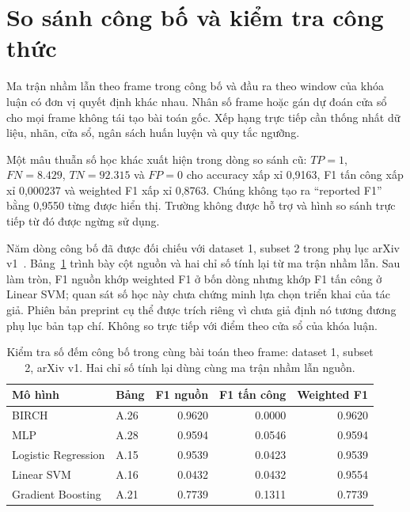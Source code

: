 \documentclass[12pt,a4paper,oneside,openany]{extbook}
\begin{document}
\section{So sánh công bố và kiểm tra công thức}
Ma trận nhầm lẫn theo frame trong công bố và đầu ra theo window của khóa luận có đơn vị quyết định khác nhau. Nhân số frame hoặc gán dự đoán cửa sổ cho mọi frame không tái tạo bài toán gốc. Xếp hạng trực tiếp cần thống nhất dữ liệu, nhãn, cửa sổ, ngân sách huấn luyện và quy tắc ngưỡng.

Một mâu thuẫn số học khác xuất hiện trong dòng so sánh cũ: $TP=1$, $FN=8.429$, $TN=92.315$ và $FP=0$ cho accuracy xấp xỉ 0,9163, F1 tấn công xấp xỉ 0,000237 và weighted F1 xấp xỉ 0,8763. Chúng không tạo ra ``reported F1'' bằng 0,9550 từng được hiển thị. Trường không được hỗ trợ và hình so sánh trực tiếp từ đó được ngừng sử dụng.

Năm dòng công bố đã được đối chiếu với dataset 1, subset 2 trong phụ lục arXiv v1~\cite{lampe2023appendix}. Bảng~\ref{tab:published} trình bày cột nguồn và hai chỉ số tính lại từ ma trận nhầm lẫn. Sau làm tròn, F1 nguồn khớp weighted F1 ở bốn dòng nhưng khớp F1 tấn công ở Linear SVM; quan sát số học này chưa chứng minh lựa chọn triển khai của tác giả. Phiên bản preprint cụ thể được trích riêng vì chưa giả định nó tương đương phụ lục bản tạp chí. Không so trực tiếp với điểm theo cửa sổ của khóa luận.

\begin{table}[htbp]\centering\small
\caption{Kiểm tra số đếm công bố trong cùng bài toán theo frame: dataset 1, subset 2, arXiv v1. Hai chỉ số tính lại dùng cùng ma trận nhầm lẫn nguồn.}\label{tab:published}
\begin{tabular}{llrrr}\toprule
Mô hình & Bảng & F1 nguồn & F1 tấn công & Weighted F1\\\midrule

BIRCH & A.26 & 0.9620 & 0.0000 & 0.9620 \\
MLP & A.28 & 0.9594 & 0.0546 & 0.9594 \\
Logistic Regression & A.15 & 0.9539 & 0.0423 & 0.9539 \\
Linear SVM & A.16 & 0.0432 & 0.0432 & 0.9554 \\
Gradient Boosting & A.21 & 0.7739 & 0.1311 & 0.7739 \\
\bottomrule

\end{tabular}\end{table}
\FloatBarrier
\end{document}
